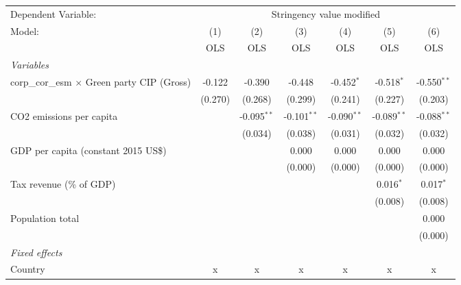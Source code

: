
\begingroup
\centering
\begin{tabular}{lcccccc}
   \toprule
   Dependent Variable: & \multicolumn{6}{c}{Stringency value modified}\\
   Model:                                             & (1)     & (2)           & (3)           & (4)           & (5)           & (6)\\  
                                                      &  OLS    & OLS           & OLS           & OLS           & OLS           & OLS\\  
   \midrule
   \emph{Variables}\\
   corp\_cor\_esm $\times$ Green party CIP (Gross)    & -0.122  & -0.390        & -0.448        & -0.452$^{*}$  & -0.518$^{*}$  & -0.550$^{**}$\\   
                                                      & (0.270) & (0.268)       & (0.299)       & (0.241)       & (0.227)       & (0.203)\\   
   CO2 emissions per capita                           &         & -0.095$^{**}$ & -0.101$^{**}$ & -0.090$^{**}$ & -0.089$^{**}$ & -0.088$^{**}$\\   
                                                      &         & (0.034)       & (0.038)       & (0.031)       & (0.032)       & (0.032)\\   
   GDP per capita (constant 2015 US\$)                &         &               & 0.000         & 0.000         & 0.000         & 0.000\\   
                                                      &         &               & (0.000)       & (0.000)       & (0.000)       & (0.000)\\   
   Tax revenue (\% of GDP)                            &         &               &               &               & 0.016$^{*}$   & 0.017$^{*}$\\   
                                                      &         &               &               &               & (0.008)       & (0.008)\\   
   Population total                                   &         &               &               &               &               & 0.000\\   
                                                      &         &               &               &               &               & (0.000)\\   
   \emph{Fixed effects}\\
   Country                                            & x       & x             & x             & x             & x             & x\\  

\end{tabular}
